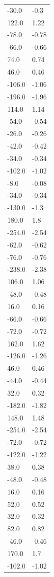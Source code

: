 \begin{longtable}{ll}
-30.0 & -0.3 \\
122.0 & 1.22 \\
-78.0 & -0.78 \\
-66.0 & -0.66 \\
74.0 & 0.74 \\
46.0 & 0.46 \\
-106.0 & -1.06 \\
-196.0 & -1.96 \\
114.0 & 1.14 \\
-54.0 & -0.54 \\
-26.0 & -0.26 \\
-42.0 & -0.42 \\
-34.0 & -0.34 \\
-102.0 & -1.02 \\
-8.0 & -0.08 \\
-34.0 & -0.34 \\
-130.0 & -1.3 \\
180.0 & 1.8 \\
-254.0 & -2.54 \\
-62.0 & -0.62 \\
-76.0 & -0.76 \\
-238.0 & -2.38 \\
106.0 & 1.06 \\
-48.0 & -0.48 \\
16.0 & 0.16 \\
-66.0 & -0.66 \\
-72.0 & -0.72 \\
162.0 & 1.62 \\
-126.0 & -1.26 \\
46.0 & 0.46 \\
-44.0 & -0.44 \\
32.0 & 0.32 \\
-182.0 & -1.82 \\
148.0 & 1.48 \\
-254.0 & -2.54 \\
-72.0 & -0.72 \\
-122.0 & -1.22 \\
38.0 & 0.38 \\
-48.0 & -0.48 \\
16.0 & 0.16 \\
52.0 & 0.52 \\
32.0 & 0.32 \\
82.0 & 0.82 \\
-46.0 & -0.46 \\
170.0 & 1.7 \\
-102.0 & -1.02 \\

\end{longtable}
